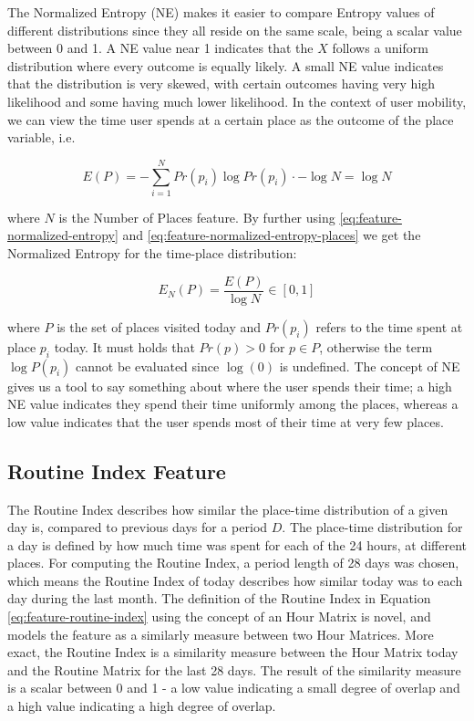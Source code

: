 The Normalized Entropy (NE) makes it easier to compare Entropy values of different distributions since they all reside on the same scale, being a scalar value between  0 and 1. A NE value near 1 indicates that the $X$ follows a uniform distribution where every outcome is equally likely. A small NE value indicates that the distribution is very skewed, with certain outcomes having very high likelihood and some having much lower likelihood.  In the context of user mobility, we can view the time user spends at a certain place as the outcome of the place variable, i.e. 

\begin{equation}
\label{eq:feature-normalized-entropy-places}
E(P) = - \sum_{i=1}^{N} Pr(p_i) \log Pr(p_i)
\cdot -\log N = \log N 
\end{equation}

where $N$ is the Number of Places feature. By further using \eqref{eq:feature-normalized-entropy} and \eqref{eq:feature-normalized-entropy-places} we get the Normalized Entropy for the time-place distribution:

\begin{equation}
\label{eq:feature-normalized-entropy}
E_N(P) = \frac{E(P)}{\log N} \in [0,1]
\end{equation}

where $P$ is the set of places visited today and $Pr(p_i)$ refers to the time spent at place $p_i$ today. It must holds that $Pr(p) > 0$ for $p \in P$, otherwise the term $\log P(p_i)$ cannot be evaluated since $\log(0)$ is undefined. The concept of NE gives us a tool to say something about where the user spends their time; a high NE value indicates they spend their time uniformly among the places, whereas a low value indicates that the user spends most of their time at very few places. 

\subsection{Routine Index Feature}
\label{sub:routine-index}
The Routine Index describes how similar the place-time distribution of a given day is, compared to previous days for a period $D$. The place-time distribution for a day is defined by how much time was spent for each of the 24 hours, at different places. For computing the Routine Index, a period length of 28 days was chosen, which means the Routine Index of today describes how similar today was to each day during the last month. The definition of the Routine Index in Equation \eqref{eq:feature-routine-index} using the concept of an Hour Matrix is novel, and models the feature as a similarly measure between two Hour Matrices. More exact, the Routine Index is a similarity measure between the Hour Matrix today and the Routine Matrix for the last 28 days. The result of the similarity measure is a scalar between 0 and 1 - a low value indicating a small degree of overlap and a high value indicating a high degree of overlap.\\

